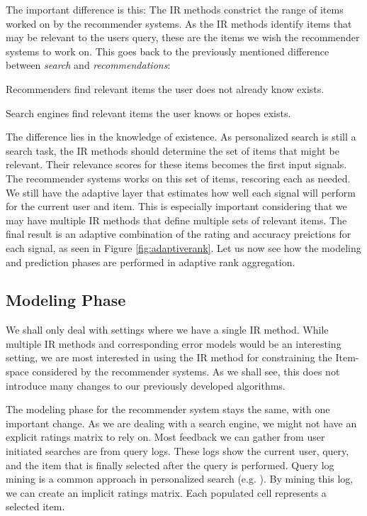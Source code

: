 The important difference is this: The IR methods constrict the range of items worked on by the recommender systems.
As the IR methods identify items that may be relevant to the users query, these are the items we wish the recommender systems to work on.
This goes back to the previously mentioned difference between \emph{search} and \emph{recommendations}:

\begin{itemize*}
  \item Recommenders find relevant items the user does not already know exists.
  \item Search engines find relevant items the user knows or hopes exists.
\end{itemize*}

The difference lies in the knowledge of existence.
As personalized search is still a search task, the IR methods should determine the set of items that might be relevant.
Their relevance scores for these items becomes the first input signals.
The recommender systems works on this set of items, rescoring each as needed.
We still have the adaptive layer that estimates how well each signal will perform for the current user and item.
This is especially important considering that we may have multiple IR methods that define multiple sets of relevant items.
The final result is an adaptive combination of the rating and accuracy preictions for each signal,
as seen in Figure \ref{fig:adaptiverank}.
Let us now see how the modeling and prediction phases are performed in adaptive rank aggregation.



\subsection{Modeling Phase}

We shall only deal with settings where we have a single IR method.
While multiple IR methods and corresponding error models would be an interesting
setting, we are most interested in using the IR method for constraining the Item-space considered by the recommender systems.
As we shall see, this does not introduce many changes to our previously developed algorithms.

The modeling phase for the recommender system stays the same, with one important change.
As we are dealing with a search engine, we might not have an explicit ratings matrix to rely on.
Most feedback we can gather from user initiated searches are from query logs.
These logs show the current user, query, and the item that is finally selected after the query is performed.
Query log mining is a common approach in personalized search
(e.g. \cite{Liu2002, Sugiyama2004, Shen2005, Speretta2000}).
By mining this log, we can create an implicit ratings matrix.
Each populated cell represents a selected item.

